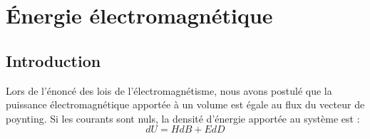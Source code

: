 \documentclass[12pt]{book}
\begin{document}
\section{\'Energie \'electromagn\'etique}\label{secenergemag2}
\subsection{Introduction}
Lors de l'\'enonc\'e des lois de l'\'electromagn\'etisme, nous avons
postul\'e que la puissance \'electromagn\'etique apport\'ee \`a un
volume est \'egale au flux du vecteur de poynting.
Si les courants sont nuls, la densit\'e d'\'energie apport\'ee au syst\`eme
est : 
\begin{equation}
dU=HdB+EdD
\end{equation}
\end{document}
